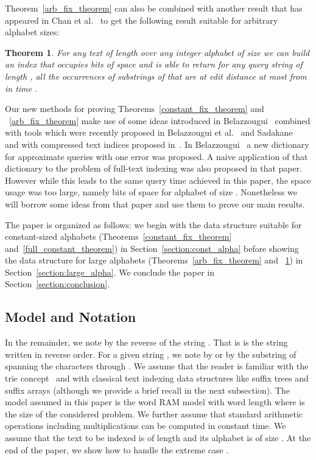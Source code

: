 \documentclass{article}
\newcommand{\?}{\mskip1.5mu}
\newtheorem{theorem}{Theorem}
\begin{document}
Theorem~\ref{arb_fix_theorem} can also be combined with another result that has appeared in Chan et al.~\cite{chan2011linear} to get the following result suitable for arbitrary alphabet sizes:
\begin{theorem}
\label{full_arb_theorem}
For any text  of length  over any integer alphabet of size  we can build an index that occupies  bits of space and is able to return for any query string  of length , all the  occurrences of substrings of  that are at edit distance at most  from  in time . 
\end{theorem}

Our new methods for proving Theorems~\ref{constant_fix_theorem} and ~\ref{arb_fix_theorem} make use of some ideas introduced in Belazzougui~\cite{B09} combined with tools which were recently proposed in Belazzougui et al.~\cite{BBPV10} and Sadakane~\cite{Sa07} and with compressed text indices proposed in~\cite{FM05,GV05}. In Belazzougui~\cite{B09} a new dictionary for approximate queries with one error was proposed. A naive application of that dictionary to the problem of full-text indexing was also proposed in that paper. However while this leads to the same  query time achieved in this paper, the space usage was too large,  namely  bits of space for alphabet of size . Nonetheless we will borrow some ideas from that paper and use them to prove our main results. 

The paper is organized as follows: we begin with the data structure suitable for constant-sized alphabets (Theorems~\ref{constant_fix_theorem} and~\ref{full_constant_theorem}) in Section~\ref{section:const_alpha} before showing the data structure for large alphabets (Theorems~\ref{arb_fix_theorem} and ~\ref{full_arb_theorem}) in Section~\ref{section:large_alpha}. We  conclude the paper in Section~\ref{section:conclusion}.

\subsection{Model and Notation}
In the remainder, we note by  the reverse of the string . That is  is the string   written in reverse order. For a given string , we note by  or by  the substring of  spanning the characters  through . We assume that the reader is familiar with the trie concept~\cite{Fr60,Kn73} and with classical text indexing data structures like suffix trees and suffix arrays (although we provide a brief recall in the next subsection). The model assumed in this paper is the word RAM model with word length  where  is the size of the considered problem. We further assume that standard arithmetic operations including multiplications can be computed in constant time. We assume that the text  to be indexed is of length  and its alphabet is of size . At the end of the paper, we show how to handle the extreme case . 
\end{document}
